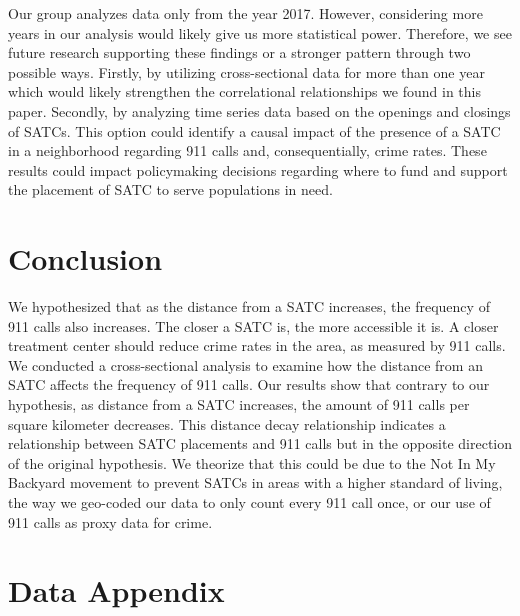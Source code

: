 \documentclass[12pt]{article}
\begin{document}
Our group analyzes data only from the year 2017. However, considering more years in our analysis would likely give us more statistical power. Therefore, we see future research supporting these findings or a stronger pattern through two possible ways. Firstly, by utilizing cross-sectional data for more than one year which would likely strengthen the correlational relationships we found in this paper. Secondly, by analyzing time series data based on the openings and closings of SATCs. This option could identify a causal impact of the presence of a SATC in a neighborhood regarding 911 calls and, consequentially, crime rates. These results could impact policymaking decisions regarding where to fund and support the placement of SATC to serve populations in need. 

\section{Conclusion}
\label{sec:conclusion}

We hypothesized that as the distance from a SATC increases, the frequency of 911 calls also increases. The closer a SATC is, the more accessible it is. A closer treatment center should reduce crime rates in the area, as measured by 911 calls. We conducted a cross-sectional analysis to examine how the distance from an SATC affects the frequency of 911 calls. Our results show that contrary to our hypothesis, as distance from a SATC increases, the amount of 911 calls per square kilometer decreases. This distance decay relationship indicates a relationship between SATC placements and 911 calls but in the opposite direction of the original hypothesis. We theorize that this could be due to the Not In My Backyard movement to prevent SATCs in areas with a higher standard of living, the way we geo-coded our data to only count every 911 call once, or our use of 911 calls as proxy data for crime. 



 

\newpage
\singlespacing
\setlength\bibsep{0pt}





\newpage
\section*{Data Appendix} \label{sec:appendixa}
\end{document}
